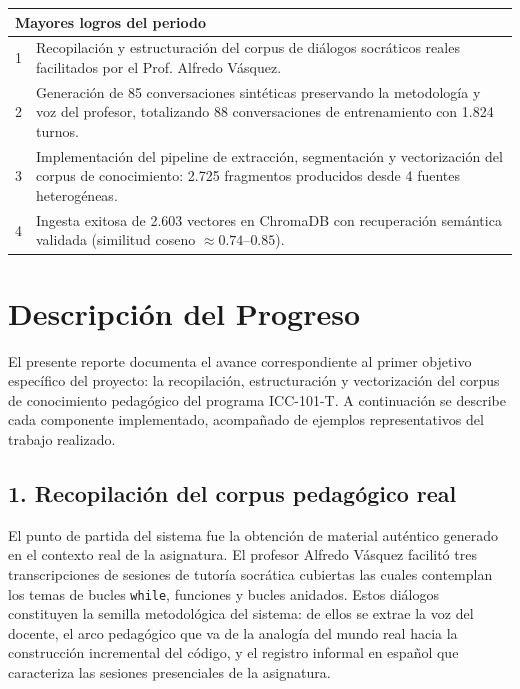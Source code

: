 \documentclass[12pt]{article}
\begin{document}
\begin{table}[h]
    \begin{tabularx}{\textwidth}{|l|X|}
        \hline
        \multicolumn{2}{|l|}{\textbf{Mayores logros del periodo}} \\
        \hline
        1 & Recopilación y estructuración del corpus de diálogos socráticos reales facilitados por el Prof. Alfredo Vásquez. \\
        \hline
        2 & Generación de 85 conversaciones sintéticas preservando la metodología y voz del profesor, totalizando 88 conversaciones de entrenamiento con 1.824 turnos. \\
        \hline
        3 & Implementación del pipeline de extracción, segmentación y vectorización del corpus de conocimiento: 2.725 fragmentos producidos desde 4 fuentes heterogéneas. \\
        \hline
        4 & Ingesta exitosa de 2.603 vectores en ChromaDB con recuperación semántica validada (similitud coseno $\approx 0.74$--$0.85$). \\
        \hline
    \end{tabularx}
\end{table}

\vspace{1em}

\section*{Descripción del Progreso}

El presente reporte documenta el avance correspondiente al primer objetivo
específico del proyecto: la recopilación, estructuración y vectorización del
corpus de conocimiento pedagógico del programa ICC-101-T. A continuación se
describe cada componente implementado, acompañado de ejemplos representativos
del trabajo realizado.

\subsection*{1. Recopilación del corpus pedagógico real}

El punto de partida del sistema fue la obtención de material auténtico generado
en el contexto real de la asignatura. El profesor Alfredo Vásquez facilitó tres
transcripciones de sesiones de tutoría socrática cubiertas las cuales contemplan
los temas de bucles \texttt{while}, funciones y bucles anidados. Estos diálogos
constituyen la semilla metodológica del sistema: de ellos se extrae la voz
del docente, el arco pedagógico que va de la analogía del mundo real hacia la
construcción incremental del código, y el registro informal en español que
caracteriza las sesiones presenciales de la asignatura.
\end{document}
